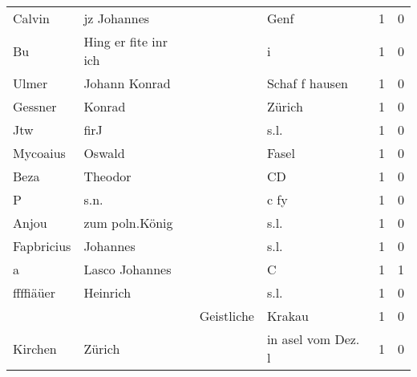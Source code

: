 \begin{center}
\begin{tiny}
\begin{longtabu}{llllrr}
                   Calvin &                        jz Johannes &             &                                        Genf &          1 &         0 \\
                       Bu &               Hing er fite inr ich &             &                                           i &          1 &         0 \\
                    Ulmer &                      Johann Konrad &             &                              Schaf f hausen &          1 &         0 \\
                  Gessner &                             Konrad &             &                                      Zürich &          1 &         0 \\
                      Jtw &                               firJ &             &                                        s.l. &          1 &         0 \\
                 Mycoaius &                             Oswald &             &                                       Fasel &          1 &         0 \\
                     Beza &                            Theodor &             &                                          CD &          1 &         0 \\
                        P &                               s.n. &             &                                        c fy &          1 &         0 \\
                    Anjou &                     zum poln.König &             &                                        s.l. &          1 &         0 \\
               Fapbricius &                           Johannes &             &                                        s.l. &          1 &         0 \\
                        a &                     Lasco Johannes &             &                                           C &          1 &         1 \\
                ffffiäüer &                           Heinrich &             &                                        s.l. &          1 &         0 \\
                          &                                    &  Geistliche &                                      Krakau &          1 &         0 \\
                  Kirchen &                             Zürich &             &                          in asel vom Dez. l &          1 &         0 \\

\end{longtabu}
\end{tiny}
\end{center}
